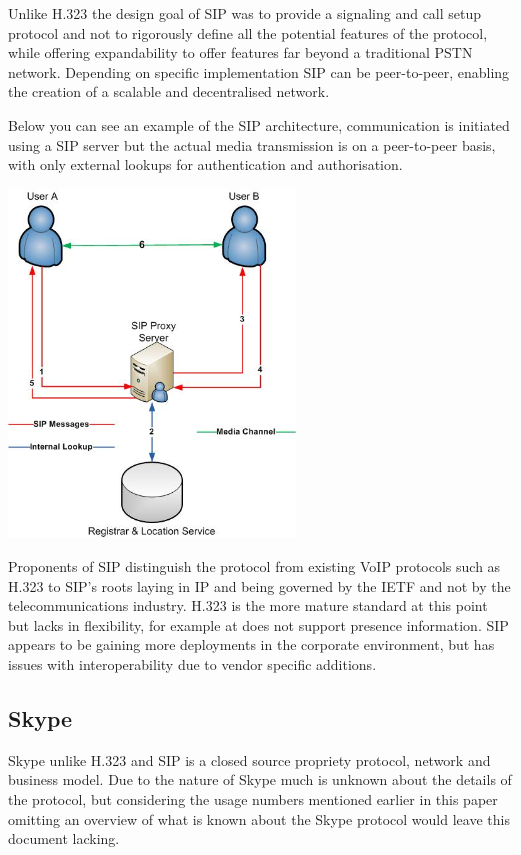 Unlike H.323 the design goal of SIP was to provide a signaling and call setup protocol and not to rigorously define all the potential features of the protocol, while offering expandability to offer features far beyond a traditional PSTN network. Depending on specific implementation SIP can be peer-to-peer, enabling the creation of a scalable and decentralised network.

Below you can see an example of the SIP architecture, communication is initiated using a SIP server but the actual media transmission is on a peer-to-peer basis, with only external lookups for authentication and authorisation.

\begin{center}
	\includegraphics[width=3in]{images/SIP_Architecture.jpg}
\end{center}

Proponents of SIP distinguish the protocol from existing VoIP protocols such as H.323 to SIP’s roots laying in IP and being governed by the IETF and not by the telecommunications industry. H.323 is the more mature standard at this point but lacks in flexibility, for example at does not support presence information. SIP appears to be gaining more deployments in the corporate environment, but has issues with interoperability due to vendor specific additions.

\subsection{Skype}
Skype unlike H.323 and SIP is a closed source propriety protocol, network and business model. Due to the nature of Skype much is unknown about the details of the protocol, but considering the usage numbers mentioned earlier in this paper omitting an overview of what is known about the Skype protocol would leave this document lacking.

